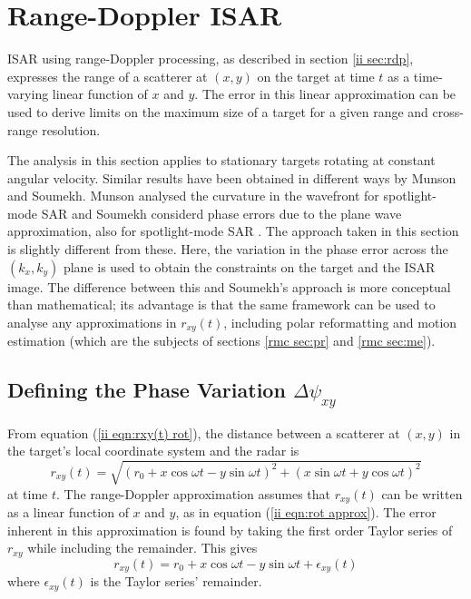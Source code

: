 \section{Range-Doppler ISAR}
\label{rmc sec:rd}

ISAR using range-Doppler processing, as described in section \ref{ii sec:rdp}, 
expresses the range of a scatterer at $(x,y)$ on the target at time $t$ as a 
time-varying linear function of $x$ and $y$.  The error in this linear
approximation can be used to derive limits on the maximum size of a target
for a given range and cross-range resolution. 

The analysis in this section applies to stationary targets rotating at
constant angular velocity.  Similar results have been obtained in different
ways by Munson and Soumekh.  Munson analysed the curvature in the wavefront 
for spotlight-mode SAR \cite[eq. (22)--(24)]{Mun83} and Soumekh considerd
phase errors due to the plane wave approximation, also for spotlight-mode SAR
\cite[eq. (A16)]{Sou92a}.  The approach taken in this section is slightly
different from these.  Here, the variation in the phase error across the
$(k_x,k_y)$ plane is used to obtain the constraints on the target and the
ISAR image.  The difference between this and Soumekh's approach is more 
conceptual than mathematical; its advantage is that the same framework can
be used to analyse any approximations in $r_{xy}(t)$, including polar
reformatting and motion estimation (which are the subjects of sections 
\ref{rmc sec:pr} and \ref{rmc sec:me}).

\subsection{Defining the Phase Variation $\Delta\psi_{xy}$}

From equation (\ref{ii eqn:rxy(t) rot}), the distance between a scatterer at
$(x,y)$ in the target's local coordinate system and the radar is
\begin{equation}
r_{xy}(t)=\sqrt{(r_0+x\cos\omega t-y\sin\omega t)^2
+(x\sin\omega t+y\cos\omega t)^2}
\end{equation}
at time $t$.  The range-Doppler approximation assumes that $r_{xy}(t)$ can
be written as a linear function of $x$ and $y$, as in equation (\ref{ii
eqn:rot approx}).  The error inherent in this approximation is found by
taking the first order Taylor series of $r_{xy}$ while including the
remainder.  This gives
\begin{equation}
r_{xy}(t)=r_0+x\cos\omega t-y\sin\omega t+\epsilon_{xy}(t)
\end{equation}
where $\epsilon_{xy}(t)$ is the Taylor series' remainder.

